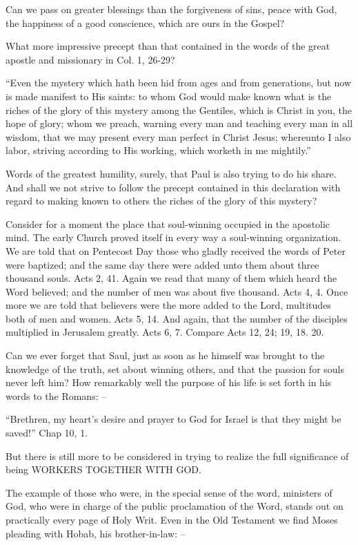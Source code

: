 \documentclass[
]{book}
\begin{document}
Can we pass on greater blessings than the forgiveness of sins, peace with God, the happiness of a good conscience, which are ours in the Gospel?

What more impressive precept than that contained in the words of the great apostle and missionary in Col. 1, 26-29?

``Even the mystery which hath been hid from ages and from generations, but now is made manifest to His saints: to whom God would make known what is the riches of the glory of this mystery among the Gentiles, which is Christ in you, the hope of glory; whom we preach, warning every man and teaching every man in all wisdom, that we may present every man perfect in Christ Jesus; whereunto I also labor, striving according to His working, which worketh in me mightily.''

Words of the greatest humility, surely, that Paul is also trying to do his share. And shall we not strive to follow the precept contained in this declaration with regard to making known to others the riches of the glory of this mystery?

Consider for a moment the place that soul-winning occupied in the apostolic mind. The early Church proved itself in every way a soul-winning organization. We are told that on Pentecost Day those who gladly received the words of Peter were baptized; and the same day there were added unto them about three thousand souls. Acts 2, 41. Again we read that many of them which heard the Word believed; and the number of men was about five thousand. Acts 4, 4. Once more we are told that believers were the more added to the Lord, multitudes both of men and women. Acts 5, 14. And again, that the number of the disciples multiplied in Jerusalem greatly. Acts 6, 7. Compare Acts 12, 24; 19, 18. 20.

Can we ever forget that Saul, just as soon as he himself was brought to the knowledge of the truth, set about winning others, and that the passion for souls never left him? How remarkably well the purpose of his life is set forth in his words to the Romans: --

``Brethren, my heart's desire and prayer to God for Israel is that they might be saved!'' Chap 10, 1.

But there is still more to be considered in trying to realize the full significance of being WORKERS TOGETHER WITH GOD.

The example of those who were, in the special sense of the word, ministers of God, who were in charge of the public proclamation of the Word, stands out on practically every page of Holy Writ. Even in the Old Testament we find Moses pleading with Hobab, his brother-in-law: --
\end{document}
